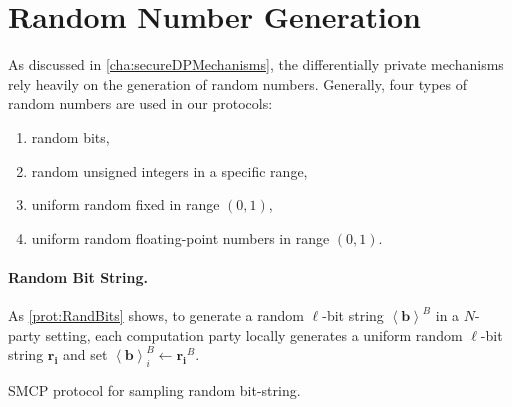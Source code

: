 \section{Random Number Generation}
\label{sec:RandomNumberGeneration}
As discussed in \autoref{cha:secureDPMechanisms}, the differentially private mechanisms rely heavily on the generation of random numbers.
Generally, four types of random numbers are used in our protocols:

\begin{enumerate}
      \item random \booleanGMW bits,
      \item random unsigned integers in a specific range,
      \item uniform random fixed in range $\left(0,1\right) $,
      \item uniform random floating-point numbers in range $\left(0,1\right) $.
\end{enumerate}

\paragraph{Random Bit String.}
As \autoref{prot:RandBits} shows, to generate a random \booleanGMW $\ell$-bit string $\left\langle \boldsymbol{b}\right\rangle^B $ in a $N$-party setting, each computation party locally generates a uniform random $\ell$-bit string $\boldsymbol{r_i}$ and set $\left\langle \boldsymbol{b}\right\rangle^B_i \gets \boldsymbol{r_i}^B$.

\begin{protocol}[tbh!]
      \centering
      \caption{SMCP protocol for sampling random bit-string.}
      \label{prot:RandBits}
\end{protocol}
\FloatBarrier

